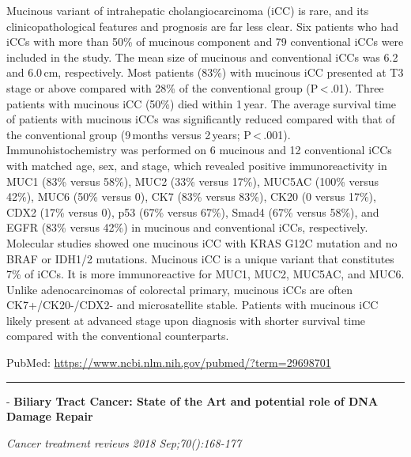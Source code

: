 \documentclass[]{article}
\begin{document}
Mucinous variant of intrahepatic cholangiocarcinoma (iCC) is rare, and
its clinicopathological features and prognosis are far less clear. Six
patients who had iCCs with more than 50\% of mucinous component and 79
conventional iCCs were included in the study. The mean size of mucinous
and conventional iCCs was 6.2 and 6.0\,cm, respectively. Most patients
(83\%) with mucinous iCC presented at T3 stage or above compared with
28\% of the conventional group (P\,\textless{}\,.01). Three patients
with mucinous iCC (50\%) died within 1\,year. The average survival time
of patients with mucinous iCCs was significantly reduced compared with
that of the conventional group (9\,months versus 2\,years;
P\,\textless{}\,.001). Immunohistochemistry was performed on 6 mucinous
and 12 conventional iCCs with matched age, sex, and stage, which
revealed positive immunoreactivity in MUC1 (83\% versus 58\%), MUC2
(33\% versus 17\%), MUC5AC (100\% versus 42\%), MUC6 (50\% versus 0),
CK7 (83\% versus 83\%), CK20 (0 versus 17\%), CDX2 (17\% versus 0), p53
(67\% versus 67\%), Smad4 (67\% versus 58\%), and EGFR (83\% versus
42\%) in mucinous and conventional iCCs, respectively. Molecular studies
showed one mucinous iCC with KRAS G12C mutation and no BRAF or IDH1/2
mutations. Mucinous iCC is a unique variant that constitutes 7\% of
iCCs. It is more immunoreactive for MUC1, MUC2, MUC5AC, and MUC6. Unlike
adenocarcinomas of colorectal primary, mucinous iCCs are often
CK7+/CK20-/CDX2- and microsatellite stable. Patients with mucinous iCC
likely present at advanced stage upon diagnosis with shorter survival
time compared with the conventional counterparts.

PubMed: \url{https://www.ncbi.nlm.nih.gov/pubmed/?term=29698701}

{}

{}

\begin{center}\rule{0.5\linewidth}{\linethickness}\end{center}

 - \textbf{Biliary Tract Cancer: State of the Art and potential role of
DNA Damage Repair}

\emph{Cancer treatment reviews 2018 Sep;70():168-177}
\end{document}
